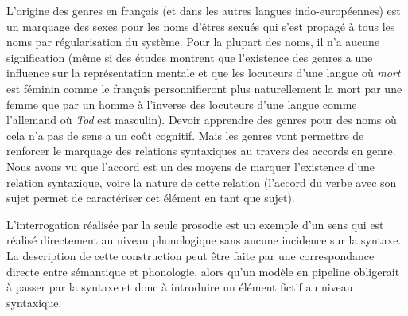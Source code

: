 {     L’origine des genres en français (et dans les autres langues indo-européennes) est un marquage des sexes pour les noms d’êtres sexués qui s’est propagé à tous les noms par régularisation du système. Pour la plupart des noms, il n’a aucune signification (même si des études montrent que l’existence des genres a une influence sur la représentation mentale et que les locuteurs d’une langue où \textit{mort} est féminin comme le français personnifieront plus naturellement la mort par une femme que par un homme à l’inverse des locuteurs d’une langue comme l’allemand où \textit{Tod} est masculin). Devoir apprendre des genres pour des noms où cela n’a pas de sens a un coût cognitif. Mais les genres vont permettre de renforcer le marquage des relations syntaxiques au travers des accords en genre. Nous avons vu que l’accord est un des moyens de marquer l’existence d’une relation syntaxique, voire la nature de cette relation (l’accord du verbe avec son sujet permet de caractériser cet élément en tant que sujet).

     L’interrogation réalisée par la seule prosodie est un exemple d’un sens qui est réalisé directement au niveau phonologique sans aucune incidence sur la syntaxe. La description de cette construction peut être faite par une correspondance directe entre sémantique et phonologie, alors qu’un modèle en pipeline obligerait à passer par la syntaxe et donc à introduire un élément fictif au niveau syntaxique.
}
